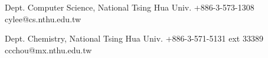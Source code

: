 \documentclass{cvclass}
\begin{document}
\begin{plainitemize}{}
\end{plainitemize}


\begin{references}

    {Dept. Computer Science, National Tsing Hua Univ.}
    {+886-3-573-1308}
    {cylee@cs.nthu.edu.tw}

    {Dept. Chemistry, National Tsing Hua Univ.}
    {+886-3-571-5131 ext 33389}
    {ccchou@mx.nthu.edu.tw}

\end{references}
\end{document}
